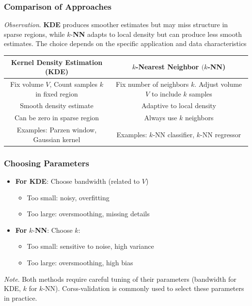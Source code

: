 \documentclass[a4paper]{article}
\theoremstyle{definition}
\begin{document}
\subsubsection{Comparison of Approaches}
\textit{Observation}. \textbf{KDE} produces smoother estimates but may miss structure in sparse regions, while \( k \)-\textbf{NN} 
adapts to local density but can produce less smooth estimates. The choice depends on
the specific application and data characteristics

\begin{center}
    \begin{tabular}{ |c|c| }
        \hline
        \textbf{Kernel Density Estimation (KDE)} & \( k \)-\textbf{Nearest Neighbor} \( (k \)-\textbf{NN}) \\
        \hline
        Fix volume \( V \), Count samples \( k \) in fixed region & Fix number of neighbors \( k \). Adjust volume \( V \) to include \( k \) samples \\
        \hline 
        Smooth density estimate & Adaptive to local density \\
        \hline 
        Can be zero in sparse region & Always use \( k \) neighbors \\
        \hline 
        Examples: Parzen window, Gaussian kernel & Examples: \( k \)-NN classifier, \( k \)-NN regressor \\
        \hline
    \end{tabular}
\end{center}
\subsubsection{Choosing Parameters}
\begin{itemize}
    \item \textbf{For KDE}: Choose bandwidth (related to \( V \))
    \begin{itemize}
        \item Too small: noisy, overfitting 
        \item Too large: oversmoothing, missing details 
    \end{itemize}
    \item \textbf{For} \( k \)-\textbf{NN}: Choose \( k \):
    \begin{itemize}
        \item Too small: sensitive to noise, high variance 
        \item Too large: oversmoothing, high bias 
    \end{itemize}
\end{itemize}
\textit{Note}. Both methods require careful tuning of their parameters (bandwidth for KDE, \( k \) for \( k \)-NN). Corss-validation is commonly used to select 
these parameters in practice.
\end{document}
